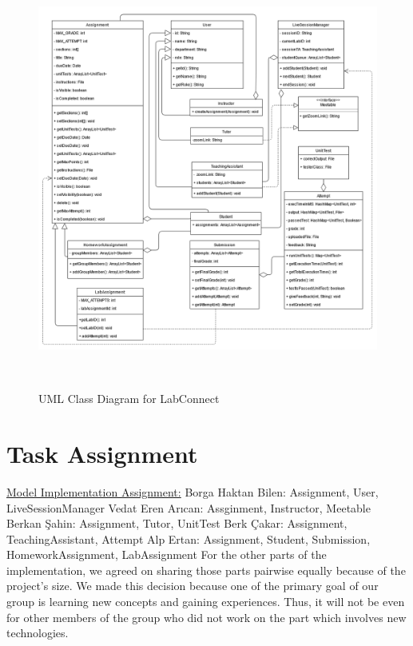 \documentclass[a4paper, 12pt]{article}
\begin{document}
    \begin{figure}[H]
        \centering
        \includegraphics[width=\textwidth]{ClassUML}
        \caption{UML Class Diagram for LabConnect}~\label{fig:class-diagram}
    \end{figure}

    
   \pagebreak
    
    \section{Task Assignment}
    
    \underline{Model Implementation Assignment:}
    \newline\newline Borga Haktan Bilen: Assignment, User, LiveSessionManager
    \newline Vedat Eren Arıcan: Assginment, Instructor, Meetable 
    \newline Berkan Şahin: Assignment, Tutor, UnitTest
    \newline Berk Çakar: Assignment, TeachingAssistant, Attempt
    \newline Alp Ertan: Assignment, Student, Submission, HomeworkAssignment, LabAssignment 
    \newline\newline For the other parts of the implementation, we agreed on sharing those parts pairwise equally 
    because of the project's size. We made this decision because one of the primary goal of our group is
    learning new concepts and gaining experiences. Thus, it will not be even for other members of the group
    who did not work on the part which involves new technologies.
    
    
        
\end{document}
